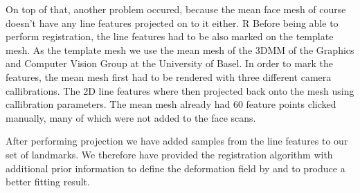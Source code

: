 On top of that, another problem occured, because the mean face mesh of course doesn't have any line features projected on to it either.
R
Before being able to perform registration, the line features had to be also marked on the template mesh. As the template mesh we use the mean mesh of the 3DMM of the Graphics and Computer Vision Group at the University of Basel. In order to mark the features, the mean mesh first had to be rendered with three different camera callibrations. The 2D line features where then projected back onto the mesh using callibration parameters. The mean mesh already had 60 feature points
clicked manually, many of which were not added to the face scans.

After performing projection we have added samples from the line features to our set of landmarks. We therefore have provided the registration algorithm with additional prior information to define the deformation field by and to produce a better fitting result.

